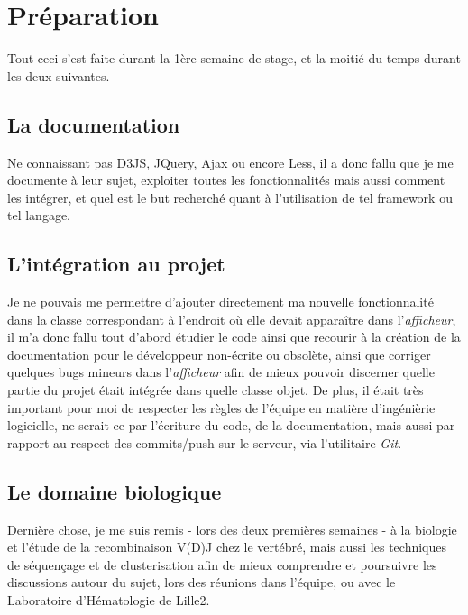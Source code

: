 \documentclass{report}
\begin{document}
\section{Préparation}
Tout ceci s'est faite durant la 1ère semaine de stage, et la moitié du temps durant les deux suivantes.

\subsection{La documentation}
Ne connaissant pas D3JS, JQuery, Ajax ou encore Less, il a donc fallu que je me documente à leur sujet, exploiter toutes les fonctionnalités mais aussi comment les intégrer, et quel est le but recherché quant à l'utilisation de tel framework ou tel langage.

\subsection{L'intégration au projet}
Je ne pouvais me permettre d'ajouter directement ma nouvelle fonctionnalité dans la classe correspondant à l'endroit où elle devait apparaître dans l'\textit{afficheur}, il m'a donc fallu tout d'abord étudier le code ainsi que recourir à la création de la documentation pour le développeur non-écrite ou obsolète, ainsi que corriger quelques bugs mineurs dans l'\textit{afficheur} afin de mieux pouvoir discerner quelle partie du projet était intégrée dans quelle classe objet.
\newline
De plus, il était très important pour moi de respecter les règles de l'équipe en matière d'ingénièrie logicielle, ne serait-ce par l'écriture du code, de la documentation, mais aussi par rapport au respect des commits/push sur le serveur, via l'utilitaire \textit{Git}.

\subsection{Le domaine biologique}
Dernière chose, je me suis remis - lors des deux premières semaines - à la biologie et l'étude de la recombinaison V(D)J chez le vertébré, mais aussi les techniques de séquençage et de clusterisation afin de mieux comprendre et poursuivre les discussions autour du sujet, lors des réunions dans l'équipe, ou avec le Laboratoire d'Hématologie de Lille2.
\end{document}
